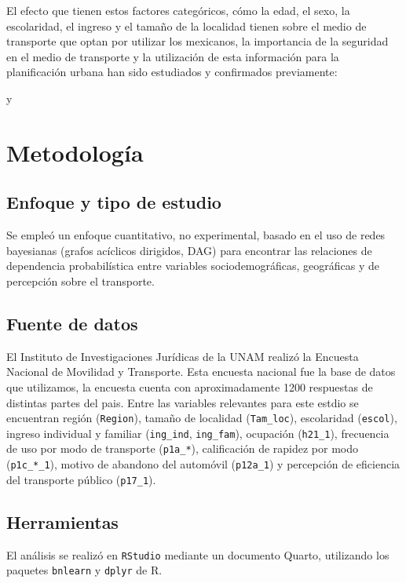 \documentclass[
  letterpaper,
  DIV=11,
  numbers=noendperiod]{scrartcl}
\begin{document}
El efecto que tienen estos factores categóricos, cómo la edad, el sexo, la 
escolaridad, el ingreso y el tamaño de la localidad tienen sobre el medio de 
transporte que optan por utilizar los mexicanos, la importancia de la seguridad 
en el medio de transporte y la utilización de esta información para la planificación 
urbana han sido estudiados y confirmados previamente:

\cite{Harbering2020} y \cite{BautistaHernandez2021} 

\cite{Moreno2023}

\cite{ObregonBiosca2018}


\section{Metodología}\label{Metodología}
\subsection{Enfoque y tipo de estudio}
Se empleó un enfoque cuantitativo, no experimental, basado en el uso de redes bayesianas (grafos acíclicos dirigidos, DAG) para encontrar las relaciones de dependencia probabilística entre variables sociodemográficas, geográficas y de percepción sobre el transporte.

\subsection{Fuente de datos}
El Instituto de Investigaciones Jurídicas de la UNAM realizó la Encuesta Nacional de Movilidad y Transporte. Esta encuesta nacional fue la base de datos que utilizamos, la encuesta cuenta con aproximadamente 1200 respuestas de distintas partes del pais. Entre las variables relevantes para este estdio se  encuentran región (\texttt{Region}), tamaño de localidad (\texttt{Tam\_loc}), escolaridad (\texttt{escol}), ingreso individual y familiar (\texttt{ing\_ind}, \texttt{ing\_fam}), ocupación (\texttt{h21\_1}), frecuencia de uso por modo de transporte (\texttt{p1a\_*}), calificación de rapidez por modo (\texttt{p1c\_*\_1}), motivo de abandono del automóvil (\texttt{p12a\_1}) y percepción de eficiencia del transporte público (\texttt{p17\_1}).

\subsection{Herramientas}
El análisis se realizó en \texttt{RStudio} mediante un documento Quarto, utilizando los paquetes \texttt{bnlearn} y \texttt{dplyr} de R.
\end{document}
